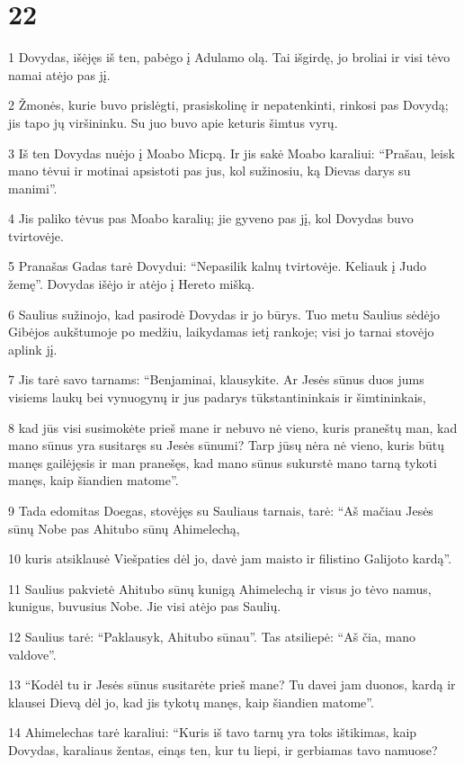 \chapter{22}


\par 1 Dovydas, išėjęs iš ten, pabėgo į Adulamo olą. Tai išgirdę, jo broliai ir visi tėvo namai atėjo pas jį. 
\par 2 Žmonės, kurie buvo prislėgti, prasiskolinę ir nepatenkinti, rinkosi pas Dovydą; jis tapo jų viršininku. Su juo buvo apie keturis šimtus vyrų. 
\par 3 Iš ten Dovydas nuėjo į Moabo Micpą. Ir jis sakė Moabo karaliui: “Prašau, leisk mano tėvui ir motinai apsistoti pas jus, kol sužinosiu, ką Dievas darys su manimi”. 
\par 4 Jis paliko tėvus pas Moabo karalių; jie gyveno pas jį, kol Dovydas buvo tvirtovėje. 
\par 5 Pranašas Gadas tarė Dovydui: “Nepasilik kalnų tvirtovėje. Keliauk į Judo žemę”. Dovydas išėjo ir atėjo į Hereto mišką. 
\par 6 Saulius sužinojo, kad pasirodė Dovydas ir jo būrys. Tuo metu Saulius sėdėjo Gibėjos aukštumoje po medžiu, laikydamas ietį rankoje; visi jo tarnai stovėjo aplink jį. 
\par 7 Jis tarė savo tarnams: “Benjaminai, klausykite. Ar Jesės sūnus duos jums visiems laukų bei vynuogynų ir jus padarys tūkstantininkais ir šimtininkais, 
\par 8 kad jūs visi susimokėte prieš mane ir nebuvo nė vieno, kuris praneštų man, kad mano sūnus yra susitaręs su Jesės sūnumi? Tarp jūsų nėra nė vieno, kuris būtų manęs gailėjęsis ir man pranešęs, kad mano sūnus sukurstė mano tarną tykoti manęs, kaip šiandien matome”. 
\par 9 Tada edomitas Doegas, stovėjęs su Sauliaus tarnais, tarė: “Aš mačiau Jesės sūnų Nobe pas Ahitubo sūnų Ahimelechą, 
\par 10 kuris atsiklausė Viešpaties dėl jo, davė jam maisto ir filistino Galijoto kardą”. 
\par 11 Saulius pakvietė Ahitubo sūnų kunigą Ahimelechą ir visus jo tėvo namus, kunigus, buvusius Nobe. Jie visi atėjo pas Saulių. 
\par 12 Saulius tarė: “Paklausyk, Ahitubo sūnau”. Tas atsiliepė: “Aš čia, mano valdove”. 
\par 13 “Kodėl tu ir Jesės sūnus susitarėte prieš mane? Tu davei jam duonos, kardą ir klausei Dievą dėl jo, kad jis tykotų manęs, kaip šiandien matome”. 
\par 14 Ahimelechas tarė karaliui: “Kuris iš tavo tarnų yra toks ištikimas, kaip Dovydas, karaliaus žentas, einąs ten, kur tu liepi, ir gerbiamas tavo namuose? 
